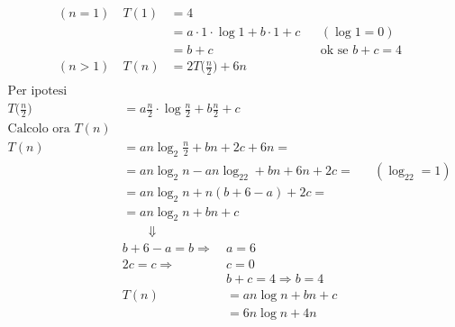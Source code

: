 \begin{align*}
	(n = 1) \quad T(1) & = 4 \\
	& = a \cdot 1 \cdot \log 1 + b \cdot 1 + c  && (\log 1 = 0)\\
	& = b + c && \text{ok se } b + c = 4 \\
	(n > 1) \quad T(n) & = 2T \big( \frac{n}{2} \big) + 6n \\
\end{align*}
\begin{align*}
	\text{Per ipotesi induttiva} \\
	T \big( \frac{n}{2} \big) & = a \frac{n}{2} \cdot \log \frac{n}{2} + b \frac{n}{2} + c \\
	\text{Calcolo ora } T(n) \\
	T(n) & = an \log_2 \frac{n}{2} + bn + 2c + 6n = \\
	& = an \log_2n - an \log_22 + bn + 6n + 2c =  && (\log_22 = 1)\\
	& = an \log_2n + n(b + 6 - a) + 2c = \\
	& = an \log_2n + bn + c \\
	& \qquad \Downarrow
\end{align*}
\begin{align*}
	b + 6 - a = b \Rightarrow \ & a = 6 \\
	2c = c \Rightarrow \ & c = 0 \\
	& b + c = 4 \Rightarrow b = 4 \\
	T(n) &= an \log n + bn + c \\
	&= 6n \log n + 4n
\end{align*}